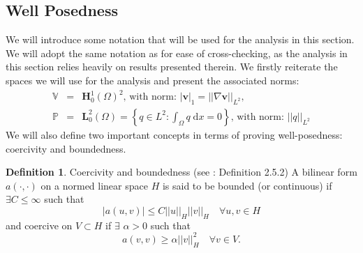 \documentclass[12pt,a4paper]{article}
\theoremstyle{definition}
\newtheorem{definition}{Definition}[section]
\begin{document}
\subsection{Well Posedness}
We will introduce some notation that will be used for the analysis in this section.  We will adopt the same notation as \cite{Chen2016} for ease of cross-checking, as the analysis in this section relies heavily on results presented therein. We firstly reiterate the spaces we will use for the analysis and present the associated norms:
\begin{eqnarray}
\mathbb{V}&=&\textbf{H}^1_0\left(\Omega\right)^2\text{, with norm: } \left|\textbf{v}\right|_{1}=\left|\left|\nabla\textbf{v}\right|\right|_{L^2}, \\
\mathbb{P}&=&\textbf{L}^2_0\left(\Omega\right)=\left\lbrace q\in L^2: \int_\Omega q\;\mathrm{d}x=0\right\rbrace\text{, with norm: } \left|\left|q\right|\right|_{L^2 }
\end{eqnarray}
We will also define two important concepts in terms of proving well-posedness: coercivity and boundedness.
\theoremstyle{definition}
\begin{definition}{Coercivity and boundedness} (see \cite{brenner2007mathematical}: Definition 2.5.2)
	A bilinear form $a\left(\cdot,\cdot\right)$ on a normed linear space $H$ is said  to be bounded (or continuous) if $\exists C\leq \infty$ such that
	\begin{equation}
		\left|a\left(u,v\right)\right|\leq C \left|\left|u\right|\right|_H\left|\left|v\right|\right|_H \quad \forall u,v \in H
	\end{equation}
	and coercive on $V\subset H$ if $\exists$ $\alpha > 0$ such that
	\begin{equation}
	a\left(v,v\right)\geq \alpha \left|\left|v\right|\right|_H^2\quad \forall v \in V.
	\end{equation}
\end{definition}
\end{document}
